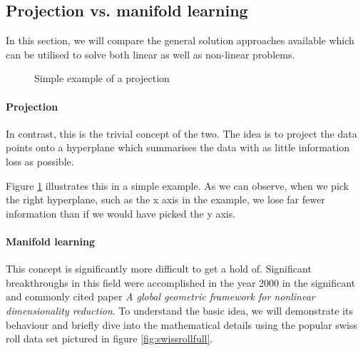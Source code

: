 \clearpage

\subsection{Projection vs. manifold learning}

In this section, we will compare the general solution approaches available which can be utilised to solve both linear as well as non-linear problems. \cite{HandsOnMLCh8}


\renewcommand{\tikzscale}{0.33}
\begin{figure}
	\vspace*{-8mm}
	\centering
	
	\captionsetup{justification=centering}
	\caption{Simple example of a projection}
    \label{fig:projectionExample}
\end{figure}

\paragraph{Projection} In contrast, this is the trivial concept of the two. The idea is to project the data points onto a \gls{hyperplane} which summarises the data with as little information loss as possible.

Figure \ref{fig:projectionExample} illustrates this in a simple example.
As we can observe, when we pick the right \gls{hyperplane}, such as the x axis in the example, we lose far fewer information than if we would have picked the y axis.


\paragraph{Manifold learning} This concept is significantly more difficult to get a hold of.
Significant breakthroughs \cite{ma2012manifold} in this field were accomplished in the year 2000 in the significant and commonly cited paper \emph{A global geometric framework for nonlinear dimensionality reduction}. \cite{tenenbaum2000global}
To understand the basic idea, we will demonstrate its behaviour and briefly dive into the mathematical details using the popular swiss roll data set pictured in figure \ref{fig:swissrollfull}.

